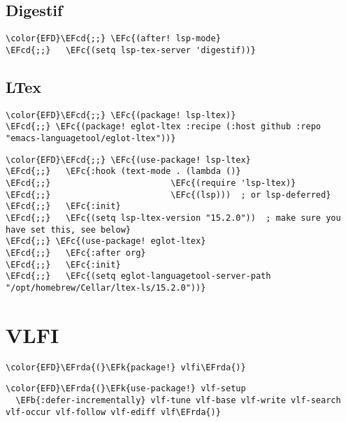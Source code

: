 \documentclass[12pt]{article}
\theoremstyle{plain}%
\theoremstyle{definition}
\theoremstyle{remark}
\newcommand{\EFc}[1]{\textcolor{EFc}{#1}} %
\newcommand{\EFcd}[1]{\textcolor{EFcd}{#1}} %
\newcommand{\EFk}[1]{\textcolor{EFk}{#1}} %
\newcommand{\EFb}[1]{\textcolor{EFb}{#1}} %
\newcommand{\EFrda}[1]{\textcolor{EFrda}{#1}} %
\begin{document}
\subsection{Digestif}
\label{sec:org6bb1051}
\begin{Code}
\begin{Verbatim}
\color{EFD}\EFcd{;;} \EFc{(after! lsp-mode}
\EFcd{;;}   \EFc{(setq lsp-tex-server 'digestif))}
\end{Verbatim}
\end{Code}
\subsection{LTex}
\label{sec:org3bec144}
\begin{Code}
\begin{Verbatim}
\color{EFD}\EFcd{;;} \EFc{(package! lsp-ltex)}
\EFcd{;;} \EFc{(package! eglot-ltex :recipe (:host github :repo "emacs-languagetool/eglot-ltex"))}
\end{Verbatim}
\end{Code}
\begin{Code}
\begin{Verbatim}
\color{EFD}\EFcd{;;} \EFc{(use-package! lsp-ltex}
\EFcd{;;}   \EFc{:hook (text-mode . (lambda ()}
\EFcd{;;}                        \EFc{(require 'lsp-ltex)}
\EFcd{;;}                        \EFc{(lsp)))  ; or lsp-deferred}
\EFcd{;;}   \EFc{:init}
\EFcd{;;}   \EFc{(setq lsp-ltex-version "15.2.0"))  ; make sure you have set this, see below}
\EFcd{;;} \EFc{(use-package! eglot-ltex}
\EFcd{;;}   \EFc{:after org}
\EFcd{;;}   \EFc{:init}
\EFcd{;;}   \EFc{(setq eglot-languagetool-server-path "/opt/homebrew/Cellar/ltex-ls/15.2.0"))}
\end{Verbatim}
\end{Code}
\section{VLFI}
\label{sec:org4284ac6}
\begin{Code}
\begin{Verbatim}
\color{EFD}\EFrda{(}\EFk{package!} vlfi\EFrda{)}
\end{Verbatim}
\end{Code}
\begin{Code}
\begin{Verbatim}
\color{EFD}\EFrda{(}\EFk{use-package!} vlf-setup
  \EFb{:defer-incrementally} vlf-tune vlf-base vlf-write vlf-search vlf-occur vlf-follow vlf-ediff vlf\EFrda{)}
\end{Verbatim}
\end{Code}
\end{document}
